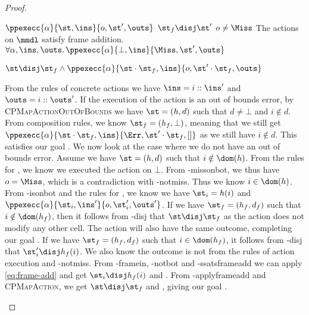 \begin{proof}

\pfassume \begin{hypvlist}
 $\ppexecc{\alpha}{\st,\ins}{o,\st',\outs}$
 $\st_f\disj\st'$
 $o\neq\Miss$
 The actions on $\mmdl$ satisfy frame addition.
{\color{red} $\forall \alpha, \ins, \outs\ldotp \ppexecc{\alpha}{\bot,\ins}{\Miss,\st',\outs}$}
\end{hypvlist}
\pfprove \begin{goalvlist}
 $\st \disj \st_f \land \ppexecc{\alpha}{\st\cdot\st_f, \ins}{o, \st'\cdot\st_f, \outs}$	
\end{goalvlist}

\pfcase{$\alpha\in\actions_\mmdl$}

\begin{hypvlist}
 From the rules of concrete actions we have $\ins=i::\ins'$ and $\outs=i::\outs'$.
 If the execution of the action is an out of bounds error, by \textsc{CPMapActionOutOfBounds} we have $\st=(h,d)$ such that $d\neq\bot$ and $i\notin d$.
 From composition rules, we know $\st_f=(h_f,\bot)$, meaning that we still get $\\\ppexecc{\alpha}{\st\cdot\st_f,\ins}{\Err,\st'\cdot\st_f,[]}$ as we still have $i\notin d$. This satisfies our goal .
 We now look at the case where we do not have an out of bounds error. Assume we have $\st=(h,d)$ such that $i\notin \dom(h)$. From the rules for , we know we executed the action on $\bot$. {\color{red}From \hyp{missonbot}, we thus have $o=\Miss$, which is a contradiction with \hyp{notmiss}. Thus we know $i\in \dom(h)$.}
 From \hyp{isonbot} and the rules for , we know we have $\st_i=h(i)$ and $\ppexecc{\alpha}{\st_i,\ins'}{o,\st_i',\outs'}$.
 If we have $\st_f=(h_f,d_f)$ such that $i\notin \dom(h_f)$, then it follows from \hyp{disj} that $\st\disj\st_f$ as the action does not modify any other cell. The action will also have the same outcome, completing our goal .
 If we have $\st_f=(h_f,d_f)$ such that $i\in\dom(h_f)$, it follows from \hyp{disj} that $\st_i'\disj h_f(i)$. We also know the outcome is not \Miss{} from the rules of action execution and \hyp{notmiss}.
 From \hyp{framein}, \hyp{notbot} and \hyp{ssatsframeadd} we can apply \ref{eq:frame-add} and get $\st_i\disj h_f(i)$ and .
 From \hyp{applyframeadd} and \textsc{CPMapAction}, we get $\st\disj\st_f$ and , giving our goal .
\end{hypvlist}


\end{proof}
